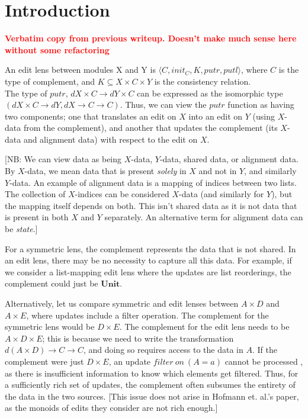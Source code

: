 \documentclass[a4paper,10pt]{article}
\title{}
\author{}
\newcommand{\finish}[1]{#1}
\newcommand{\comment}[1]{\finish{\textbf{\textcolor{red}{#1}}}}
\newcommand{\Unit}{\ensuremath{\mathbf{Unit}}}
\begin{document}
\maketitle

\section{Introduction}
\comment{Verbatim copy from previous writeup. Doesn't make much sense
  here without some refactoring}

An edit lens between modules X and Y is $\langle C, init_C, K, putr, putl \rangle$, where $C$ is the type of complement, and $K \subseteq X \times C \times Y$ is the consistency relation. \\
The type of $putr$, $dX \times C \to dY \times C$ can be expressed as
the isomorphic type $(dX \times C \to dY, dX \to C \to C)$. Thus, we
can view the $putr$ function as having two components; one that
translates an edit on $X$ into an edit on $Y$ (using $X$-data from the
complement), and another that updates the complement (its $X$-data and
alignment data) with respect to the edit on $X$.
 
[NB: We can view data as being $X$-data, $Y$-data, shared data, or
alignment data. By $X$-data, we mean data that is present
\emph{solely} in $X$ and not in $Y$, and similarly $Y$-data. An
example of alignment data is a mapping of indices between two
lists. The collection of $X$-indices can be considered $X$-data (and
similarly for $Y$), but the mapping itself depends on both. This isn't
shared data as it is not data that is present in both $X$ and $Y$
separately. An alternative term for alignment data can be
\emph{state}.]

For a symmetric lens, the complement represents the data that is not
shared. In an edit lens, there may be no necessity to capture all this
data. For example, if we consider a list-mapping edit lens where the
updates are list reorderings, the complement could just be \Unit.
 
Alternatively, let us compare symmetric and edit lenses between $A
\times D$ and $A \times E$, where updates include a filter
operation. The complement for the symmetric lens would be $D \times
E$.  The complement for the edit lens needs to be $A \times D \times
E$; this is because we need to write the transformation $d(A \times D)
\to C \to C$, and doing so requires access to the data in $A$. If the
complement were just $D \times E$, an update $filter~on~(A=a)$ cannot
be processed , as there is insufficient information to know which
elements get filtered. Thus, for a sufficiently rich set of updates,
the complement often subsumes the entirety of the data in the two
sources. [This issue does not arise in Hofmann et. al.'s paper, as
the monoids of edits they consider are not rich enough.]
\end{document}
